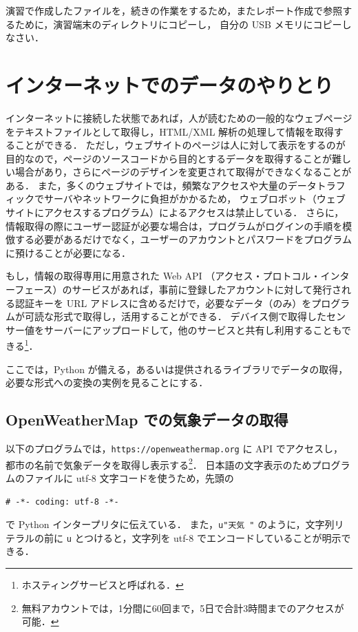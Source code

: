 \documentclass[11pt,a4,epsf]{article}
\begin{document}
\begin{excercise}
演習で作成したファイルを，続きの作業をするため，またレポート作成で参照するために，演習端末のディレクトリにコピーし，
自分の USB メモリにコピーしなさい．
\end{excercise}

\section{インターネットでのデータのやりとり}

インターネットに接続した状態であれば，人が読むための一般的なウェブページをテキストファイルとして取得し，HTML/XML 解析の処理して情報を取得することができる．
ただし，ウェブサイトのページは人に対して表示をするのが目的なので，ページのソースコードから目的とするデータを取得することが難しい場合があり，さらにページのデザインを変更されて取得ができなくなることがある．
また，多くのウェブサイトでは，頻繁なアクセスや大量のデータトラフィックでサーバやネットワークに負担がかかるため，
ウェブロボット（ウェブサイトにアクセスするプログラム）によるアクセスは禁止している．
さらに，情報取得の際にユーザー認証が必要な場合は，プログラムがログインの手順を模倣する必要があるだけでなく，ユーザーのアカウントとパスワードをプログラムに預けることが必要になる．

もし，情報の取得専用に用意された Web API （アクセス・プロトコル・インターフェース）のサービスがあれば，事前に登録したアカウントに対して発行される認証キーを URL アドレスに含めるだけで，必要なデータ（のみ）をプログラムが可読な形式で取得し，活用することができる．
デバイス側で取得したセンサー値をサーバーにアップロードして，他のサービスと共有し利用することもできる\footnote{ホスティングサービスと呼ばれる．}．

ここでは，Python が備える，あるいは提供されるライブラリでデータの取得，必要な形式への変換の実例を見ることにする．

\subsection{OpenWeatherMap での気象データの取得}

以下のプログラムでは，\verb+https://openweathermap.org+ に API でアクセスし，都市の名前で気象データを取得し表示する\footnote{無料アカウントでは，1分間に60回まで，5日で合計3時間までのアクセスが可能．}．
日本語の文字表示のためプログラムのファイルに utf-8 文字コードを使うため，先頭の
\begin{verbatim}
# -*- coding: utf-8 -*-
\end{verbatim}
で Python インタープリタに伝えている．
また，\verb+u"天気 "+  のように，文字列リテラルの前に \verb+u+ とつけると，文字列を utf-8 でエンコードしていることが明示できる．
\end{document}
